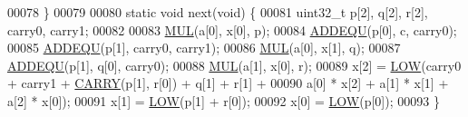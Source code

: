 \begin{DoxyCode}
00078 \}
00079 
00080 \textcolor{keyword}{static} \textcolor{keywordtype}{void} next(\textcolor{keywordtype}{void}) \{
00081     uint32\_t p[2], q[2], r[2], carry0, carry1;
00082 
00083     \hyperlink{rand_8c_aa41c2259bde5ac4595509b753d07129f}{MUL}(a[0], x[0], p);
00084     \hyperlink{rand_8c_a904860fb195e49dc24c327820db12801}{ADDEQU}(p[0], c, carry0);
00085     \hyperlink{rand_8c_a904860fb195e49dc24c327820db12801}{ADDEQU}(p[1], carry0, carry1);
00086     \hyperlink{rand_8c_aa41c2259bde5ac4595509b753d07129f}{MUL}(a[0], x[1], q);
00087     \hyperlink{rand_8c_a904860fb195e49dc24c327820db12801}{ADDEQU}(p[1], q[0], carry0);
00088     \hyperlink{rand_8c_aa41c2259bde5ac4595509b753d07129f}{MUL}(a[1], x[0], r);
00089     x[2] = \hyperlink{rand_8c_a627b1c92232deafa6370178448d76527}{LOW}(carry0 + carry1 + \hyperlink{rand_8c_acf24db0ba1fe8c642a00871c3156f536}{CARRY}(p[1], r[0]) + q[1] + r[1] +
00090             a[0] * x[2] + a[1] * x[1] + a[2] * x[0]);
00091     x[1] = \hyperlink{rand_8c_a627b1c92232deafa6370178448d76527}{LOW}(p[1] + r[0]);
00092     x[0] = \hyperlink{rand_8c_a627b1c92232deafa6370178448d76527}{LOW}(p[0]);
00093 \}
\end{DoxyCode}
